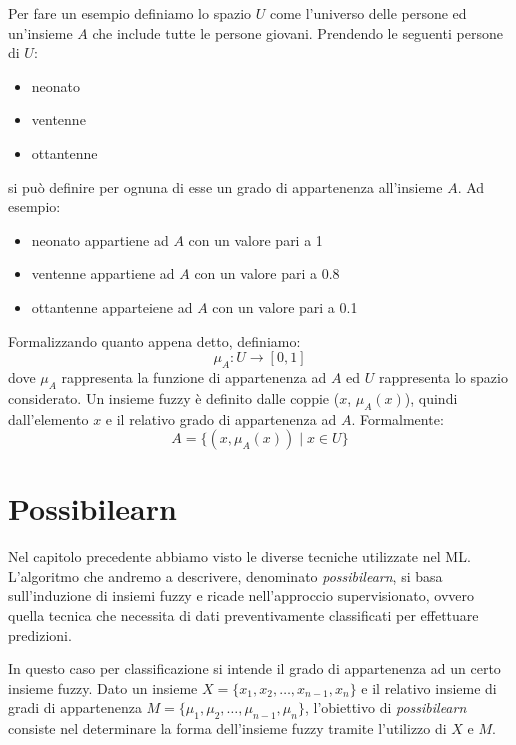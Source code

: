 \documentclass[12pt,italian]{report}
\begin{document}
Per fare un esempio definiamo lo spazio $ U $ come l'universo delle persone ed un'insieme $ A $ che include tutte le persone giovani.
Prendendo le seguenti persone di $ U $:
\begin{itemize}
	\item neonato
	\item ventenne
	\item ottantenne
\end{itemize}
si può definire per ognuna di esse un grado di appartenenza all'insieme $ A $. Ad esempio:
\begin{itemize}
	\item neonato appartiene ad $ A $ con un valore pari a 1
	\item ventenne appartiene ad $ A $ con un valore pari a 0.8
	\item ottantenne apparteiene ad $ A $ con un valore pari a 0.1
\end{itemize}
Formalizzando quanto appena detto, definiamo:
\[ \mu_{A}: U \rightarrow [0,1] \]
dove $ \mu_{A} $ rappresenta la funzione di appartenenza ad $ A $ ed $ U $ rappresenta lo spazio considerato. Un insieme fuzzy è definito dalle coppie ($x$,  $ \mu_{A}(x)$), quindi dall'elemento $ x $ e il relativo grado di appartenenza ad $ A $. Formalmente:
\[ A = \{  (x, \mu_{A}(x)) \mid x \in U\} \]

\section{Possibilearn}

Nel capitolo precedente abbiamo visto le diverse tecniche utilizzate nel ML. L'algoritmo che andremo a descrivere, denominato \emph{possibilearn}, si basa sull'induzione di insiemi fuzzy e ricade nell'approccio supervisionato, ovvero quella tecnica che necessita di dati preventivamente classificati per effettuare predizioni.

In questo caso per classificazione si intende il grado di appartenenza ad un certo insieme fuzzy. 
Dato un insieme $ X = \{ x_{1}, x_{2}, \ldots, x_{n-1}, x_{n}\} $ e il relativo insieme di gradi di appartenenza $ M = \{\mu_{1}, \mu_{2}, \ldots, \mu_{n-1}, \mu_{n}\} $, l'obiettivo di \emph{possibilearn} consiste nel determinare la forma dell'insieme fuzzy tramite l'utilizzo di $ X $ e $ M $.
\end{document}
